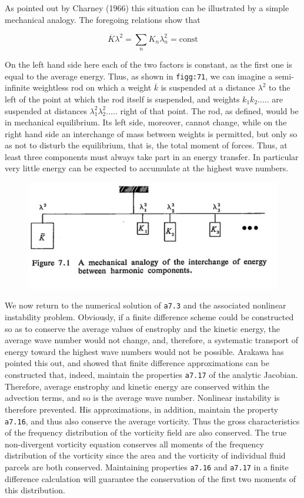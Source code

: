 As pointed out by Charney (1966) this situation can be illustrated by a
simple mechanical analogy. The foregoing relations show that

\[\overline{K}\lambda^{2} = \sum_{n}K_{n}\lambda_{n}^{2} = \text{const}\]

On the left hand side here each of the two factors is constant, as the
first one is equal to the average energy. Thus, as shown in
\texttt{figg:71}, we can imagine a semi-infinite weightless rod on
which a weight \( \overline{k}\) is suspended at a distance
\(\lambda^{2}\) to the left of the point at which the rod itself is
suspended, and weights \(k_{1}k_{2}\ldots.. \) are suspended at
distances \(\lambda_{1}^{2}\lambda_{2}^{2}\ldots..\) right of that
point. The rod, as defined, would be in mechanical equilibrium. Its left
side, moreover, cannot change, while on the right hand side an
interchange of mass between weights is permitted, but only so as not to
disturb the equilibrium, that is, the total moment of forces. Thus, at
least three components must always take part in an energy transfer. In
particular very little energy can be expected to accumulate at the
highest wave numbers.

\begin{figure}
\centering
\includegraphics[width = .7 \textwidth]{figs/NM/pic71.jpg}
\caption{} \label{fig:}
\end{figure}

We now return to the numerical solution of \texttt{a7.3} and the
associated nonlinear instability problem. Obviously, if a finite
difference scheme could be constructed so as to conserve the average
values of enstrophy and the kinetic energy, the average wave number
would not change, and, therefore, a systematic transport of energy
toward the highest wave numbers would not be possible. Arakawa has
pointed this out, and showed that finite difference approximations can
be constructed that, indeed, maintain the properties \texttt{a7.17} of
the analytic Jacobian. Therefore, average enstrophy and kinetic energy
are conserved within the advection terms, and so is the average wave
number. Nonlinear instability is therefore prevented. His
approximations, in addition, maintain the property \texttt{a7.16}, and
thus also conserve the average vorticity. Thus the gross characteristics
of the frequency distribution of the vorticity field are also conserved.
The true non-divergent vorticity equation conserves all moments of the
frequency distribution of the vorticity since the area and the vorticity
of individual fluid parcels are both conserved. Maintaining properties
\texttt{a7.16} and \texttt{a7.17} in a finite difference calculation
will guarantee the conservation of the first two moments of this
distribution.

